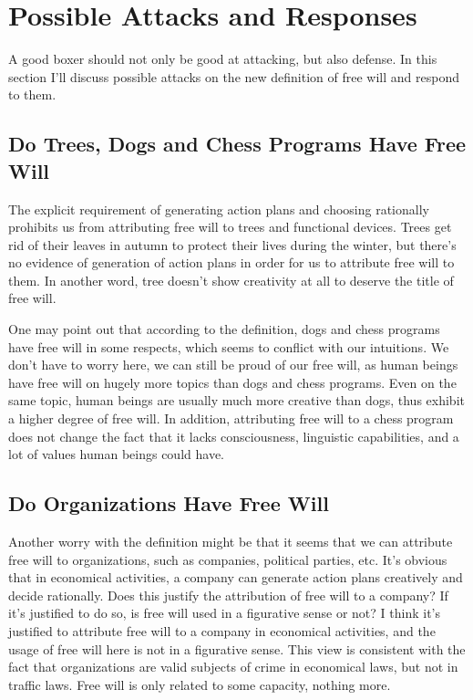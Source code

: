 \section{Possible Attacks and Responses}

A good boxer should not only be good at attacking, but also defense. In this section I'll discuss possible attacks on the new definition of free will and respond to them.

\subsection{Do Trees, Dogs and Chess Programs Have Free Will}

The explicit requirement of generating action plans and choosing rationally prohibits us from attributing free will to trees and functional devices. Trees get rid of their leaves in autumn to protect their lives during the winter, but there’s no evidence of generation of action plans in order for us to attribute free will to them. In another word, tree doesn't show creativity at all to deserve the title of free will.

One may point out that according to the definition, dogs and chess programs have free will in some respects, which seems to conflict with our intuitions. We don’t have to worry here, we can still be proud of our free will, as human beings have free will on hugely more topics than dogs and chess programs. Even on the same topic, human beings are usually much more creative than dogs, thus exhibit a higher degree of free will. In addition, attributing free will to a chess program does not change the fact that it lacks consciousness, linguistic capabilities, and a lot of values human beings could have.

\subsection{Do Organizations Have Free Will}

Another worry with the definition might be that it seems that we can attribute free will to organizations, such as companies, political parties, etc. It’s obvious that in economical activities, a company can generate action plans creatively and decide rationally. Does this justify the attribution of free will to a company? If it’s justified to do so, is free will used in a figurative sense or not? I think it’s justified to attribute free will to a company in economical activities, and the usage of free will here is not in a figurative sense. This view is consistent with the fact that organizations are valid subjects of crime in economical laws, but not in traffic laws. Free will is only related to some capacity, nothing more.

